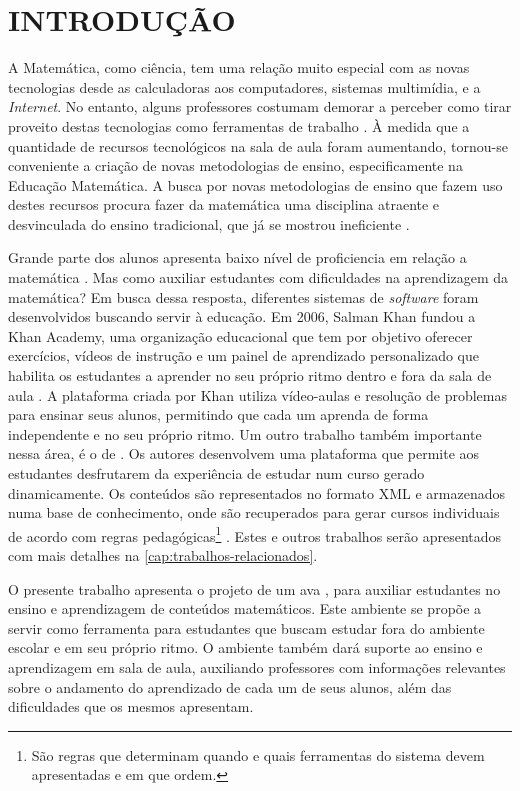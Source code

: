 \chapter{INTRODUÇÃO}
\label{cap:introducao}

A Matemática, como ciência, tem uma relação muito especial com as novas tecnologias desde as calculadoras aos computadores, sistemas 
multim\'idia, e a \textit{Internet}. No entanto, alguns professores costumam demorar a perceber como tirar proveito destas tecnologias como 
ferramentas de trabalho \cite{da1997ensino}. \`A medida que a quantidade de recursos tecnológicos na sala de aula foram aumentando, 
tornou-se conveniente a criação de novas metodologias de ensino, especificamente na Educação Matemática. A busca por novas 
metodologias de ensino que fazem uso destes recursos procura fazer da matemática uma disciplina atraente e desvinculada do ensino 
tradicional, que já se mostrou ineficiente \cite{silva2009ambiente}.

Grande parte dos alunos apresenta baixo nível de \gls{proficiencia} em relação a matem\'atica \cite{de2006dificuldades}. Mas como auxiliar 
estudantes com dificuldades na aprendizagem da matemática? Em busca dessa 
resposta, diferentes sistemas de \textit{software} foram desenvolvidos buscando servir \`a  educação. Em 2006, Salman Khan fundou a Khan 
Academy, uma organização educacional que tem por objetivo oferecer exercícios, vídeos de instrução e um painel de aprendizado personalizado 
que habilita os estudantes a aprender no seu próprio ritmo dentro e fora da sala de aula \cite{khan2012one}. A plataforma criada por Khan 
utiliza vídeo-aulas e resolução de problemas para ensinar seus alunos, permitindo que cada um aprenda de forma independente e no seu 
pr\'oprio ritmo. Um outro trabalho também  importante nessa área, \'e o de  . Os autores desenvolvem uma 
plataforma que permite aos estudantes desfrutarem da experiência de estudar num curso gerado dinamicamente. Os conte\'udos s\~ao 
representados no formato XML \cite{bray1998extensible} e armazenados numa base de conhecimento, onde s\~ao recuperados para gerar cursos 
individuais de acordo com regras pedagógicas\footnote{S\~ao regras que determinam quando e quais ferramentas do sistema devem apresentadas 
e em que ordem.} \cite{melis2004activemath}. Estes e outros trabalhos serão apresentados com mais detalhes 
na \autoref{cap:trabalhos-relacionados}.

O presente trabalho apresenta o projeto de um \gls{ava} \cite{valentini2010aprendizagem}, para auxiliar 
estudantes no ensino e aprendizagem de conteúdos matemáticos. Este ambiente se propõe a servir como ferramenta para estudantes que buscam 
estudar fora do ambiente escolar e em seu próprio ritmo. O ambiente também dará suporte ao ensino e aprendizagem em sala de aula, 
auxiliando professores com informações relevantes sobre o andamento do aprendizado de cada um de seus alunos, além das dificuldades que os 
mesmos apresentam.

